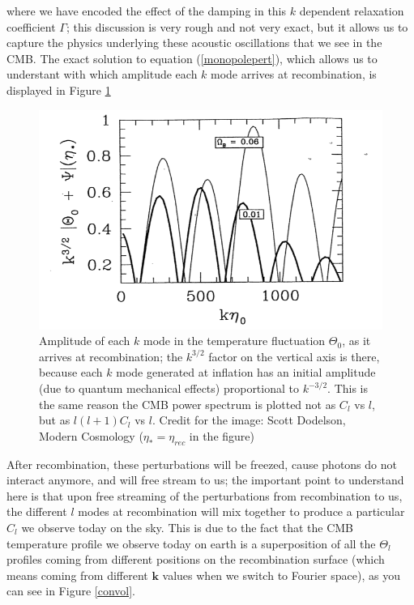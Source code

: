 where we have encoded the effect of the damping in this $k$ dependent relaxation coefficient $\Gamma$; this discussion is very rough and not very exact, but it allows us to capture the physics underlying these acoustic oscillations that we see in the CMB. The exact solution to equation (\ref{monopolepert}), which allows us to understant with which amplitude each $k$ mode arrives at recombination, is displayed in Figure \ref{kpert} 
\begin{figure}
\begin{center}
\includegraphics[scale=1.0]{CMB/pert.png}
\end{center}
\caption{Amplitude of each $k$ mode in the temperature fluctuation $\Theta_0$, as it arrives at recombination; the $k^{3/2}$ factor on the vertical axis is there, because each $k$ mode generated at inflation has an initial amplitude (due to quantum mechanical effects) proportional to $k^{-3/2}$. This is the same reason the CMB power spectrum is plotted not as $C_l$ vs $l$, but as $l(l+1)C_l$ vs $l$. Credit for the image: Scott Dodelson, Modern Cosmology ($\eta_*=\eta_{rec}$ in the figure)}
\label{kpert}
\end{figure}
After recombination, these perturbations will be freezed, cause photons do not interact anymore, and will free stream to us; the important point to understand here is that upon free streaming of the perturbations from recombination to us, the different $l$ modes at recombination will mix together to produce a particular $C_l$ we observe today on the sky. This is due to the fact that the CMB temperature profile we observe today on earth is a superposition of all the $\Theta_l$ profiles coming from different positions on the recombination surface (which means coming from different $\mathbf{k}$ values when we switch to Fourier space), as you can see in Figure \ref{convol}.
